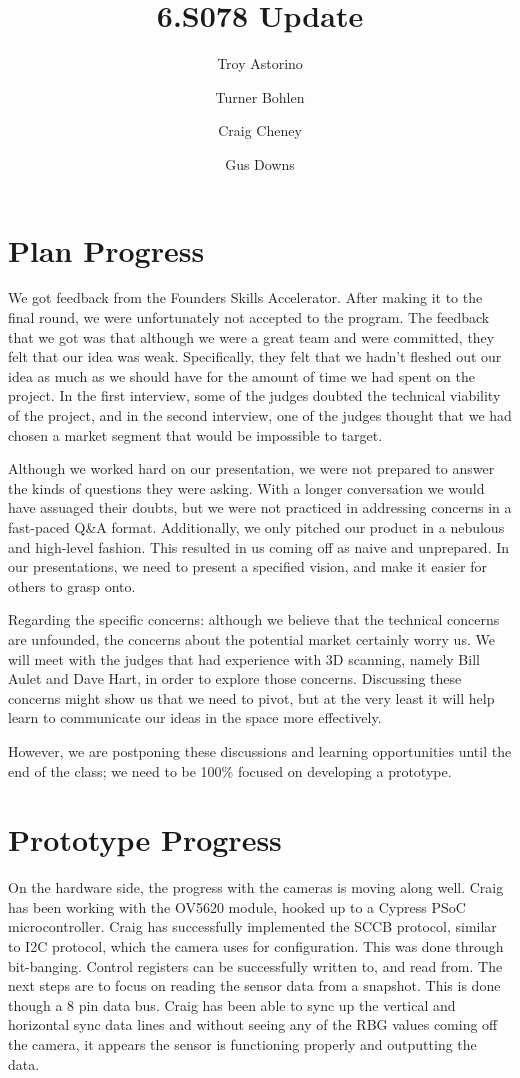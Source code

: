 \documentclass[10pt]{article}
\title{\vspace{-4em}6.S078 Update}
\author{Troy Astorino \and Turner Bohlen \and Craig Cheney \and Gus Downs}
\begin{document}
\maketitle
\vspace{-4em}

\section{Plan Progress}
We got feedback from the Founders Skills Accelerator. After making it to the final round, we were unfortunately not
accepted to the program.  The feedback that we got was that although we were a
great team and were committed, they felt that our idea was weak. Specifically,
they felt that we hadn't fleshed out our idea as much as we should have for the
amount of time we had spent on the project. In the first interview, some of the
judges doubted the technical viability of the project, and in the second
interview, one of the judges thought that we had chosen a market segment that
would be impossible to target.

Although we worked hard on our presentation, we were not prepared to answer the
kinds of questions they were asking. With a longer conversation we would have
assuaged their doubts, but we were not practiced in addressing concerns in a
fast-paced Q\&A format. Additionally, we only pitched our product in a nebulous
and high-level fashion. This resulted in us coming off as naive and unprepared.
In our presentations, we need to present a specified vision, and make it easier
for others to grasp onto.

Regarding the specific concerns: although we believe that the technical concerns
are unfounded, the concerns about the potential market certainly worry us. We
will meet with the judges that had experience with 3D scanning, namely Bill
Aulet and Dave Hart, in order to explore those concerns. Discussing these
concerns might show us that we need to pivot, but at the very least it will help
learn to communicate our ideas in the space more effectively. 

However, we are postponing these discussions and learning opportunities until
the end of the class; we need to be 100\% focused on developing a prototype.

\section{Prototype Progress}

	On the hardware side, the progress with the cameras is moving along well. Craig has been working with the OV5620 module, hooked up to a Cypress PSoC microcontroller. Craig has successfully implemented the SCCB protocol, similar to I2C protocol, which the camera uses for configuration. This was done through bit-banging. Control registers can be successfully written to, and read from. The next steps are to focus on reading the sensor data from a snapshot. This is done though a 8 pin data bus. Craig has been able to sync up the vertical and horizontal sync data lines and without seeing any of the RBG values coming off the camera, it appears the sensor is functioning properly and outputting the data. 
\end{document}
